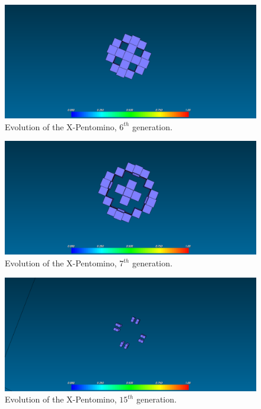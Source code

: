 \begin{figure}
	\centering
	\includegraphics[scale=0.3]{pentominoes_ss/x_6.png}
	\caption{Evolution of the X-Pentomino, $6^{th}$ generation.}
	\label{fig:ss-pent:x-6}
\end{figure}

\begin{figure}
	\centering
	\includegraphics[scale=0.3]{pentominoes_ss/x_7.png}
	\caption{Evolution of the X-Pentomino, $7^{th}$ generation.}
	\label{fig:ss-pent:x-7}
\end{figure}

\begin{figure}
	\centering
	\includegraphics[scale=0.3]{pentominoes_ss/x_15.png}
	\caption{Evolution of the X-Pentomino, $15^{th}$ generation.}
	\label{fig:ss-pent:x-15}
\end{figure}

